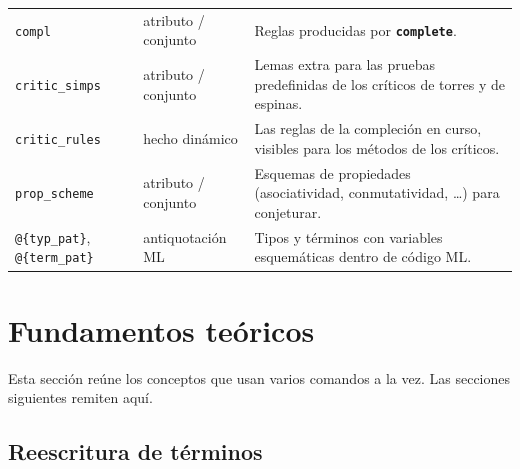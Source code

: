 \documentclass[11pt,a4paper]{article}
\newcommand{\isa}[1]{\texttt{#1}}
\newcommand{\cmd}[1]{\textbf{\texttt{#1}}}
\theoremstyle{definition}
\theoremstyle{remark}
\begin{document}
\begin{longtable}{@{}p{5.6cm}>{\raggedright\arraybackslash}p{2.2cm}>{\raggedright\arraybackslash}p{6.6cm}@{}}
\midrule
\isa{compl} & atributo / conjunto & Reglas producidas por \cmd{complete}.\\
\isa{critic\_simps} & atributo / conjunto & Lemas extra para las pruebas predefinidas
  de los críticos de torres y de espinas.\\
\isa{critic\_rules} & hecho dinámico & Las reglas de la compleción en curso, visibles
  para los métodos de los críticos.\\
\isa{prop\_scheme} & atributo / conjunto & Esquemas de propiedades (asociatividad,
  conmutatividad, \ldots) para conjeturar.\\
\midrule
\isa{@\{typ\_pat\}}, \isa{@\{term\_pat\}} & antiquotación ML & Tipos y términos con
  variables esquemáticas dentro de código ML.\\
\bottomrule
\end{longtable}

\section{Fundamentos teóricos}
\label{sec:teoria}

Esta sección reúne los conceptos que usan varios comandos a la vez. Las secciones
siguientes remiten aquí.

\subsection{Reescritura de términos}
\end{document}
